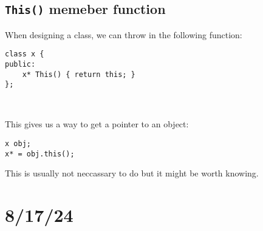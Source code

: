 \documentclass{report}
\begin{document}
\subsection{\texttt{This()} memeber function}
When designing a class, we can throw in the following function:
\begin{verbatim}
class x {
public:
    x* This() { return this; }
};

    
\end{verbatim}
This gives us a way to get a pointer to an object:
\begin{verbatim}
x obj;
x* = obj.this();
\end{verbatim}
This is usually not neccassary to do but it might be worth knowing.
\section{8/17/24}
\end{document}
